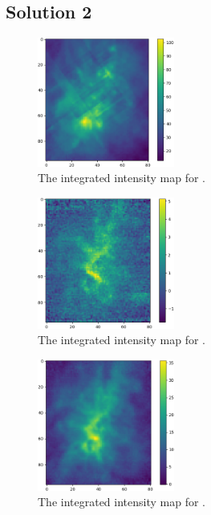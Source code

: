 \documentclass[11pt]{article}
\newenvironment{tight_enumerate}{
\begin{enumerate}[label=(\alph*)]
\setlength{\itemsep}{3pt}
\setlength{\parskip}{0pt}
}{\end{enumerate}}
\begin{document}
\subsection*{Solution 2}
\begin{tight_enumerate}
\item \leavevmode
\begin{multicols}{2}
\begin{figure}[H]
\centering
\includegraphics[width=0.4\textwidth]{12co_intensity.png}
\caption*{The integrated intensity map for .}
\end{figure}
\begin{figure}[H]
\centering
\includegraphics[width=0.4\textwidth]{c18o_intensity.png}
\caption*{The integrated intensity map for .}
\end{figure}
\begin{figure}[H]
\centering
\includegraphics[width=0.4\textwidth]{13co_intensity.png}
\caption*{The integrated intensity map for .}
\end{figure}

\end{multicols}
\end{tight_enumerate}
\end{document}
